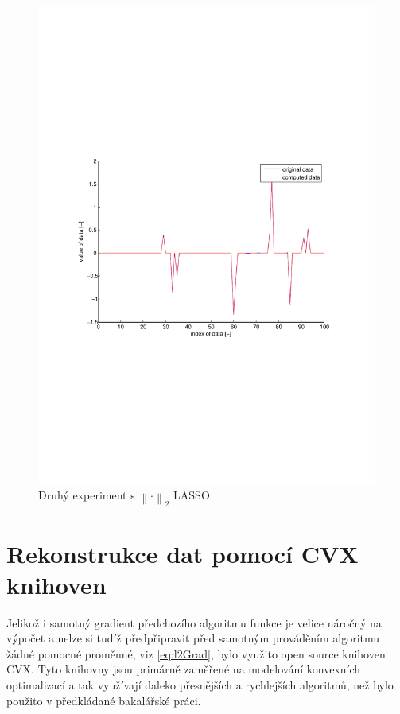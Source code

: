 \documentclass[FM,BP]{tulthesis}
\begin{document}
\begin{figure}[!ht]
	\begin{center}
		\includegraphics[scale=0.7]{obr/l2-finish.pdf}
	\end{center}
	\caption{Druhý experiment s $\left\| \cdot \right\|_{2}$ LASSO}
	\label{fig:l2finish}
\end{figure}

\section{Rekonstrukce dat pomocí CVX knihoven}
\label{subch:l2CVX}
Jelikož i samotný gradient předchozího algoritmu funkce je velice náročný na výpočet a nelze si tudíž předpřipravit před samotným prováděním algoritmu žádné pomocné proměnné, viz \ref{eq:l2Grad}, bylo využito open source knihoven CVX. Tyto knihovny jsou primárně zaměřené na modelování konvexních optimalizací a tak využívají daleko přesnějších a rychlejších algoritmů, než bylo použito v předkládané bakalářské práci. 
\end{document}
